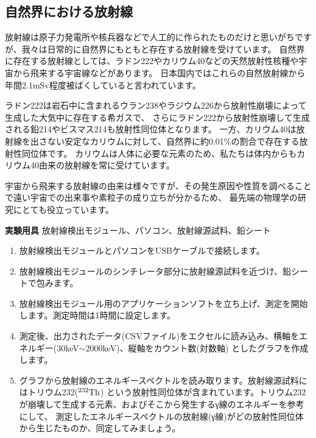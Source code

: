 \subsection{自然界における放射線}

放射線は原子力発電所や核兵器などで人工的に作られたものだけと思いがちですが、我々は日常的に自然界にもともと存在する放射線を受けています。
自然界に存在する放射線としては、ラドン222やカリウム40などの天然放射性核種や宇宙から飛来する宇宙線などがあります。
日本国内ではこれらの自然放射線から年間2.1mSv程度被ばくしていると言われています。

ラドン222は岩石中に含まれるウラン238やラジウム226から放射性崩壊によって生成した大気中に存在する希ガスで、
さらにラドン222から放射性崩壊して生成される鉛214やビスマス214も放射性同位体となります。
一方、カリウム40は放射線を出さない安定なカリウムに対して、自然界に約0.01\%の割合で存在する放射性同位体です。
カリウムは人体に必要な元素のため、私たちは体内からもカリウム40由来の放射線を常に受けています。

宇宙から飛来する放射線の由来は様々ですが、その発生原因や性質を調べることで遠い宇宙での出来事や素粒子の成り立ちが分かるため、
最先端の物理学の研究にとても役立っています。

\newpage

\jikken

\begin{itemsquarebox}[c]{\bf 実験用具}
放射線検出モジュール、パソコン、放射線源試料、鉛シート
\end{itemsquarebox}

\bigskip


\begin{enumerate}

\item 放射線検出モジュールとパソコンをUSBケーブルで接続します。

\item 放射線検出モジュールのシンチレータ部分に放射線源試料を近づけ、鉛シートで包みます。

\item 放射線検出モジュール用のアプリケーションソフトを立ち上げ、測定を開始します。測定時間は1時間に設定します。

\item 測定後、出力されたデータ(CSVファイル)をエクセルに読み込み、横軸をエネルギー(30keV$\sim$2000keV)、縦軸をカウント数(対数軸)
としたグラフを作成します。

\item グラフから放射線のエネルギースペクトルを読み取ります。放射線源試料にはトリウム232(${}^{232}{\rm Th}$)
という放射性同位体が含まれています。トリウム232が崩壊して生成する元素、およびそこから発生するγ線のエネルギーを参考にして、
測定したエネルギースペクトルの放射線(γ線)がどの放射性同位体から生じたものか、同定してみましょう。



\end{enumerate}

